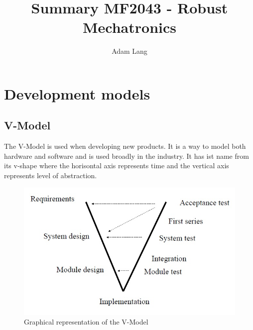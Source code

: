 \documentclass[12pt,a4paper]{article}
\title{Summary MF2043 - Robust Mechatronics}
\author{Adam Lang}
\begin{document}
\maketitle





\section{Development models}
  \subsection{V-Model}

The V-Model is used when developing new products. It is a way to model
both hardware and software and is used broadly in the industry.
It has ist name from its v-shape where the horisontal axis represents
time and the vertical axis represents level of abstraction. 

\begin{figure}[!h]
  \centering
  \includegraphics[scale=0.5]{VModel} 
  \caption{Graphical representation of the V-Model}
  \label{fig:Vmodel}
\end{figure}
\end{document}
